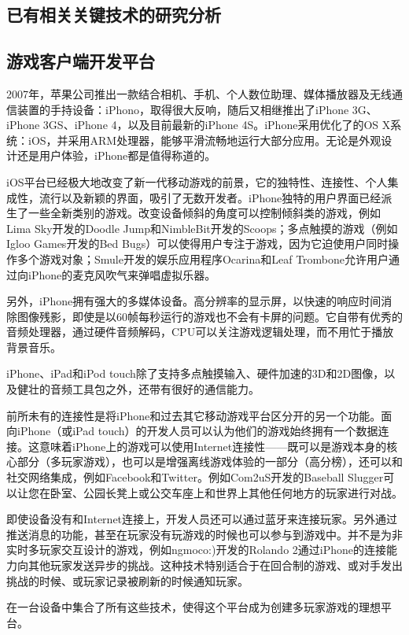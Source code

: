 \documentclass{article}
\begin{document}
\begin{CJK}{UTF8}{gbsn}
	\section{已有相关关键技术的研究分析}
	\subsection{游戏客户端开发平台}
  2007年，苹果公司推出一款结合相机、手机、个人数位助理、媒体播放器及无线通信装置的手持设备：iPhono，取得很大反响，随后又相继推出了iPhone 3G、iPhone 3GS、iPhone 4，以及目前最新的iPhone 4S。iPhone采用优化了的OS X系统：iOS，并采用ARM处理器，能够平滑流畅地运行大部分应用。无论是外观设计还是用户体验，iPhone都是值得称道的。

  iOS平台已经极大地改变了新一代移动游戏的前景，它的独特性、连接性、个人集成性，流行以及新颖的界面，吸引了无数开发者。iPhone独特的用户界面已经派生了一些全新类别的游戏。改变设备倾斜的角度可以控制倾斜类的游戏，例如Lima Sky开发的Doodle Jump和NimbleBit开发的Scoops；多点触摸的游戏（例如Igloo Games开发的Bed Bugs）可以使得用户专注于游戏，因为它迫使用户同时操作多个游戏对象；Smule开发的娱乐应用程序Ocarina和Leaf Trombone允许用户通过向iPhone的麦克风吹气来弹唱虚拟乐器\cite{B02}。

  另外，iPhone拥有强大的多媒体设备。高分辨率的显示屏，以快速的响应时间消除图像残影，即使是以60帧每秒运行的游戏也不会有卡屏的问题。它自带有优秀的音频处理器，通过硬件音频解码，CPU可以关注游戏逻辑处理，而不用忙于播放背景音乐。

  iPhone、iPad和iPod touch除了支持多点触摸输入、硬件加速的3D和2D图像，以及健壮的音频工具包之外，还带有很好的通信能力。
  
  前所未有的连接性是将iPhone和过去其它移动游戏平台区分开的另一个功能。面向iPhone（或iPad touch）的开发人员可以认为他们的游戏始终拥有一个数据连接。这意味着iPhone上的游戏可以使用Internet连接性——既可以是游戏本身的核心部分（多玩家游戏），也可以是增强离线游戏体验的一部分（高分榜），还可以和社交网络集成，例如Facebook和Twitter。例如Com2uS开发的Baseball Slugger可以让您在卧室、公园长凳上或公交车座上和世界上其他任何地方的玩家进行对战。

  即使设备没有和Internet连接上，开发人员还可以通过蓝牙来连接玩家。另外通过推送消息的功能，甚至在玩家没有玩游戏的时候也可以参与到游戏中。并不是为非实时多玩家交互设计的游戏，例如ngmoco:)开发的Rolando 2通过iPhone的连接能力向其他玩家发送异步的挑战。这种技术特别适合于在回合制的游戏、或对手发出挑战的时候、或玩家记录被刷新的时候通知玩家。\cite{B02}

  在一台设备中集合了所有这些技术，使得这个平台成为创建多玩家游戏的理想平台。


\end{CJK}
\end{document}
